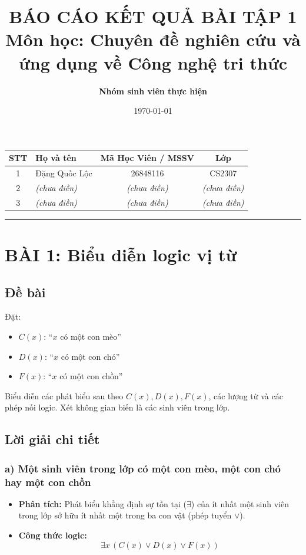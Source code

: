 \documentclass[12pt,a4paper]{article}
\title{\textbf{BÁO CÁO KẾT QUẢ BÀI TẬP 1}\\ \large Môn học: Chuyên đề nghiên cứu và ứng dụng về Công nghệ tri thức}
\author{\textbf{Nhóm sinh viên thực hiện}}
\date{\today}
\begin{document}
\maketitle

\begin{center}
\begin{tabular}{|c|l|c|c|}
\hline
\textbf{STT} & \textbf{Họ và tên} & \textbf{Mã Học Viên / MSSV} & \textbf{Lớp} \\
\hline
1 & Đặng Quốc Lộc & 26848116 & CS2307 \\
2 & \textit{(chưa điền)} & \textit{(chưa điền)} & \textit{(chưa điền)} \\
3 & \textit{(chưa điền)} & \textit{(chưa điền)} & \textit{(chưa điền)} \\
\hline
\end{tabular}
\end{center}

\vspace{5mm}
\hrule
\vspace{5mm}

\tableofcontents
\newpage

\section{BÀI 1: Biểu diễn logic vị từ}

\subsection{Đề bài}
Đặt:
\begin{itemize}
    \item $C(x)$: ``$x$ có một con mèo''
    \item $D(x)$: ``$x$ có một con chó''
    \item $F(x)$: ``$x$ có một con chồn''
\end{itemize}
Biểu diễn các phát biểu sau theo $C(x), D(x), F(x)$, các lượng từ và các phép nối logic. Xét không gian biến là các sinh viên trong lớp.

\subsection{Lời giải chi tiết}

\subsubsection{a) Một sinh viên trong lớp có một con mèo, một con chó hay một con chồn}
\begin{itemize}
    \item \textbf{Phân tích:} Phát biểu khẳng định sự tồn tại ($\exists$) của ít nhất một sinh viên trong lớp sở hữu ít nhất một trong ba con vật (phép tuyển $\lor$).
    \item \textbf{Công thức logic:}
    \begin{equation}
        \exists x \, (C(x) \lor D(x) \lor F(x))
    \end{equation}
\end{itemize}
\end{document}
